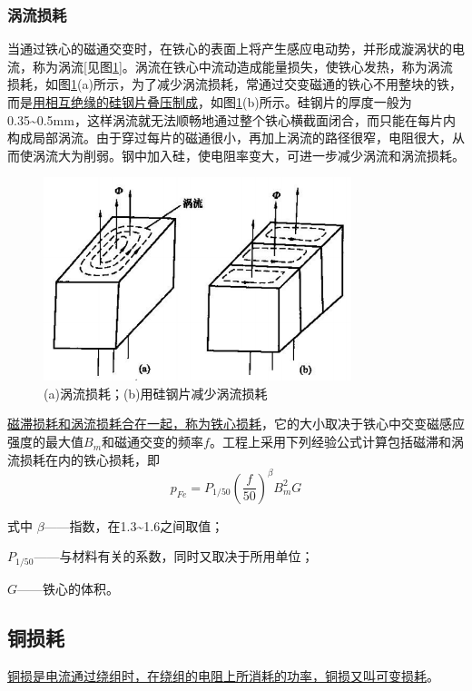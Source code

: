 \documentclass{book}
\begin{document}
\subsubsection{涡流损耗}
当通过铁心的磁通交变时，在铁心的表面上将产生感应电动势，并形成漩涡状的电流，称为涡流[见图\ref{fig_1.5}]。涡流在铁心中流动造成能量损失，使铁心发热，称为涡流损耗，如图\ref{fig_1.5}(a)所示，为了减少涡流损耗，常通过交变磁通的铁心不用整块的铁，而是\uline{用相互绝缘的硅钢片叠压制成}，如图\ref{fig_1.5}(b)所示。硅钢片的厚度一般为0.35\textasciitilde0.5mm，这样涡流就无法顺畅地通过整个铁心横截面闭合，而只能在每片内构成局部涡流。由于穿过每片的磁通很小，再加上涡流的路径很窄，电阻很大，从而使涡流大为削弱。钢中加入硅，使电阻率变大，可进一步减少涡流和涡流损耗。
\begin{figure}[H]
	\centering
	\includegraphics[width=0.80\textwidth]{1-5.png}
	\caption{(a)涡流损耗；(b)用硅钢片减少涡流损耗}
	\label{fig_1.5}
\end{figure}

\uline{磁滞损耗和涡流损耗合在一起，称为铁心损耗}，它的大小取决于铁心中交变磁感应强度的最大值${{B}_{m}}$和磁通交变的频率$f$。工程上采用下列经验公式计算包括磁滞和涡流损耗在内的铁心损耗，即
\begin{equation}
{{p}_{Fe}}={{P}_{1/50}}{{\left( \frac{f}{50} \right)}^{\beta }}B_{m}^{2}G
\label{eq9}
\end{equation}	

式中  $\beta $——指数，在1.3\textasciitilde1.6之间取值；

${{P}_{1/50}}$——与材料有关的系数，同时又取决于所用单位；

$G$——铁心的体积。

\subsection{铜损耗}
\uline{铜损是电流通过绕组时，在绕组的电阻上所消耗的功率，铜损又叫可变损耗}。
\end{document}
